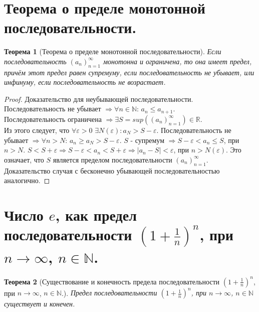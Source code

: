 \documentclass[12pt, a4]{article}
\newtheorem*{theorem}{Теорема}
\renewcommand{\epsilon}{\varepsilon}
\newcommand{\R}{\mathbb{R}}
\newcommand{\N}{\mathbb{N}}
\begin{document}
\section{Теорема о пределе монотонной последовательности.}

\begin{theorem}[Теорема о пределе монотонной последовательности]
Если последовательность $(a_n)_{n=1}^\infty$ монотонна и ограничена, то она имеет предел, причём этот предел равен супремуму, если последовательность не убывает, или инфинуму, если последовательность не возрастает.
\end{theorem}

\begin{proof}
Доказательство для неубывающей последовательности.\\
Последовательность не убывает $\Rightarrow \forall n \in \N$: $a_n \leq a_{n+1}$.\\
Последовательность ограничена $\Rightarrow \exists S = sup((a_n)_{n=1}^\infty) \in \R $.\\
Из этого следует, что $\forall \epsilon > 0$ $\exists N(\epsilon): a_N > S - \epsilon$. Последовательность не убывает $\Rightarrow \forall n > N$: $a_n \geq a_N > S-\epsilon$. $S$ - супремум $\Rightarrow S - \epsilon < a_n \leq S$, при $n > N$. $S < S + \epsilon \Rightarrow S-\epsilon < a_n < S+\epsilon \Rightarrow |a_n - S| < \epsilon$, при $n > N(\epsilon)$. Это означает, что $S$ является пределом последовательности $(a_n)_{n=1}^\infty$. Доказательство случая с бесконечно убывающей последовательностью аналогично.
\end{proof}

\section{Число $e$, как предел последовательности $(1 + \frac{1}{n})^n$, при $n \rightarrow \infty$, $n \in \N$.}

\begin{theorem}%
[Существование и конечность предела последовательности $(1 + \frac{1}{n})^n$, при $n \rightarrow \infty$, $n \in \N$.]
Предел последовательности $(1 + \frac{1}{n})^n$, при $n \rightarrow \infty$, $n \in \N$ существует и конечен.
\end{theorem}
\end{document}
